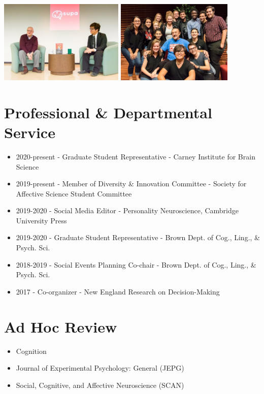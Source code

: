\documentclass[
]{article}
\providecommand{\tightlist}{%
  \setlength{\itemsep}{0pt}\setlength{\parskip}{0pt}}
\begin{document}
\includegraphics[height=150px]{images/bandura}
\includegraphics[height=150px]{images/zimbardo}

\hypertarget{professional-departmental-service}{%
\section{Professional \& Departmental
Service}\label{professional-departmental-service}}

\begin{itemize}
\tightlist
\item
  2020-present - Graduate Student Representative - Carney Institute for
  Brain Science
\item
  2019-present - Member of Diversity \& Innovation Committee - Society
  for Affective Science Student Committee
\item
  2019-2020 - Social Media Editor - Personality Neuroscience, Cambridge
  University Press
\item
  2019-2020 - Graduate Student Representative - Brown Dept. of Cog.,
  Ling., \& Psych. Sci.
\item
  2018-2019 - Social Events Planning Co-chair - Brown Dept. of Cog.,
  Ling., \& Psych. Sci.
\item
  2017 - Co-organizer - New England Research on Decision-Making
\end{itemize}

\hypertarget{ad-hoc-review}{%
\section{Ad Hoc Review}\label{ad-hoc-review}}

\begin{itemize}
\tightlist
\item
  Cognition
\item
  Journal of Experimental Psychology: General (JEPG)
\item
  Social, Cognitive, and Affective Neuroscience (SCAN)
\end{itemize}
\end{document}
